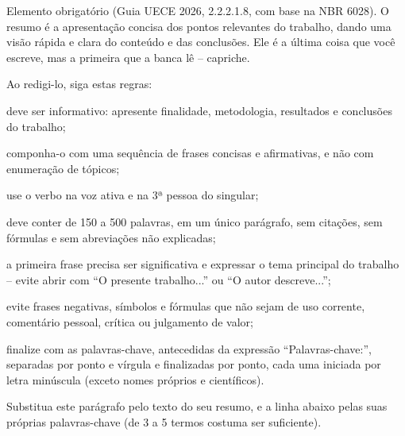 Elemento obrigatório (Guia UECE 2026, 2.2.2.1.8, com base na NBR 6028). O resumo é a apresentação concisa dos pontos relevantes do trabalho, dando uma visão rápida e clara do conteúdo e das conclusões. Ele é a última coisa que você escreve, mas a primeira que a banca lê -- capriche.

Ao redigi-lo, siga estas regras:

\begin{alineas}
	\item deve ser informativo: apresente finalidade, metodologia, resultados e conclusões do trabalho;
	\item componha-o com uma sequência de frases concisas e afirmativas, e não com enumeração de tópicos;
	\item use o verbo na voz ativa e na 3ª pessoa do singular;
	\item deve conter de 150 a 500 palavras, em um único parágrafo, sem citações, sem fórmulas e sem abreviações não explicadas;
	\item a primeira frase precisa ser significativa e expressar o tema principal do trabalho -- evite abrir com ``O presente trabalho...'' ou ``O autor descreve...'';
	\item evite frases negativas, símbolos e fórmulas que não sejam de uso corrente, comentário pessoal, crítica ou julgamento de valor;
	\item finalize com as palavras-chave, antecedidas da expressão ``Palavras-chave:'', separadas por ponto e vírgula e finalizadas por ponto, cada uma iniciada por letra minúscula (exceto nomes próprios e científicos).
\end{alineas}

Substitua este parágrafo pelo texto do seu resumo, e a linha abaixo pelas suas próprias palavras-chave (de 3 a 5 termos costuma ser suficiente).

